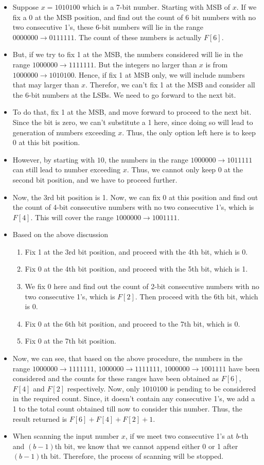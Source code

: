 \begin{itemize}
\item Suppose $x=1010100$ which is a 7-bit number. Starting with MSB of $x$. If we fix a 0 at the MSB position, and find out the count of 6 bit numbers with no two consecutive 1's, these 6-bit numbers will lie in the range $0000000 \longrightarrow 0111111$. The count of these numbers is actually $F[6]$.
\item But, if we try to fix 1 at the MSB, the numbers considered will lie in the range $1000000 \longrightarrow 1111111$. But the integers no larger than $x$ is from $1000000 \longrightarrow 1010100$. Hence, if fix 1 at MSB only, we will include numbers that may larger than $x$. Therefor, we can't fix 1 at the MSB and consider all the 6-bit numbers at the LSBs. We need to go forward to the next bit.
\item To do that, fix 1 at the MSB, and move forward to proceed to the next bit. Since the bit is zero, we can't substitute a 1 here, since doing so will lead to generation of numbers exceeding $x$. Thus, the only option left here is to keep 0 at this bit position.
\item However, by starting with $10$, the numbers in the range $1000000 \longrightarrow 1011111$ can still lead to number exceeding $x$. Thus, we cannot only keep 0 at the second bit position, and we have to proceed further.
\item Now, the 3rd bit position is 1. Now, we can fix 0 at this position and find out the count of 4-bit consecutive numbers with no two consecutive 1's, which is $F[4]$. This will cover the range $1000000\longrightarrow 1001111$.
\item Based on the above discussion
\begin{enumerate}
\item Fix 1 at the 3rd bit position, and proceed with the 4th bit, which is 0.
\item Fix 0 at the 4th bit position, and proceed with the 5th bit, which is 1.
\item We fix 0 here and find out the count of 2-bit consecutive numbers with no two consecutive 1's, which is $F[2]$. Then proceed with the 6th bit, which is 0.
\item Fix 0 at the 6th bit position, and proceed to the 7th bit, which is 0.
\item Fix 0 at the 7th bit position.
\end{enumerate}
\item Now, we can see, that based on the above procedure, the numbers in the range $1000000\longrightarrow 1111111$, $1000000\longrightarrow1111111$, $1000000\longrightarrow1001111$ have been considered and the counts for these ranges have been obtained as $F[6]$, $F[4]$ and $F[2]$ respectively. Now, only $1010100$ is pending to be considered in the required count. Since, it doesn't contain any consecutive 1's, we add a 1 to the total count obtained till now to consider this number. Thus, the result returned is $F[6]+F[4]+F[2]+1$.
\item When scanning the input number $x$, if we meet two consecutive 1's at $b$-th and $(b-1)$th bit, we know that we cannot append either 0 or 1 after $(b-1)$th bit. Therefore, the process of scanning will be stopped.
\end{itemize}